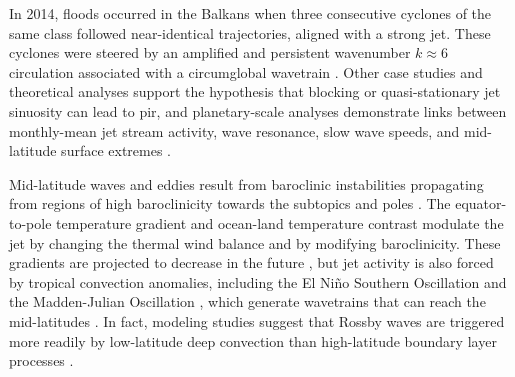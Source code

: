 \documentclass[11pt]{article}
\begin{document}
In 2014, floods occurred in the Balkans when three consecutive cyclones of the same class followed near-identical trajectories, aligned with a strong jet.
These cyclones were steered by an amplified and persistent wavenumber $k \approx 6$ circulation \citep{Stadtherr2016} associated with a circumglobal wavetrain \citep{Branstator2002}.
Other case studies \citep{Grams2014,Nakamura2012} and theoretical analyses \citep{Hoskins2015} support the hypothesis that blocking or quasi-stationary jet sinuosity can lead to {pir}, and planetary-scale analyses demonstrate links between monthly-mean jet stream activity, wave resonance, slow wave speeds,  and mid-latitude surface extremes \citep{Screen2014,Coumou2014}.

Mid-latitude waves and eddies result from baroclinic instabilities propagating from regions of high baroclinicity towards the subtopics and poles \citep{Shaw2016}.
The equator-to-pole temperature gradient and ocean-land temperature contrast modulate the jet by changing the thermal wind balance and by modifying baroclinicity.
These gradients are projected to decrease in the future \citep{Cohen2014}, but jet activity is also forced by tropical convection anomalies, including the El Ni\~{n}o Southern Oscillation and the Madden-Julian Oscillation \citep{Karamperidou2012}, which generate wavetrains that can reach the mid-latitudes \citep{Roundy2012}.
In fact, modeling studies suggest that Rossby waves are triggered more readily by low-latitude deep convection than high-latitude boundary layer processes \citep{Hoskins1981}.
\end{document}
